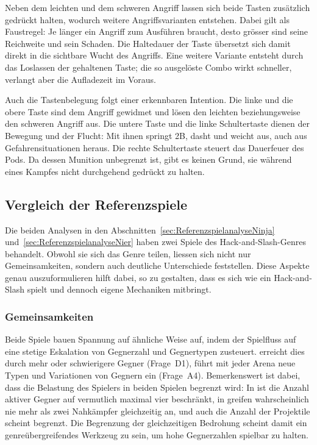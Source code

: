 \documentclass[../Main.tex]{subfiles}
\begin{document}
Neben dem leichten und dem schweren Angriff lassen sich beide Tasten zusätzlich gedrückt halten, wodurch weitere Angriffsvarianten entstehen. Dabei gilt als Faustregel: Je länger ein Angriff zum Ausführen braucht, desto grösser sind seine Reichweite und sein Schaden. Die Haltedauer der Taste übersetzt sich damit direkt in die sichtbare Wucht des Angriffs. Eine weitere Variante entsteht durch das Loslassen der gehaltenen Taste; die so ausgelöste Combo wirkt schneller, verlangt aber die Aufladezeit im Voraus.

Auch die Tastenbelegung folgt einer erkennbaren Intention. Die linke und die obere Taste sind dem Angriff gewidmet und lösen den leichten beziehungsweise den schweren Angriff aus. Die untere Taste und die linke Schultertaste dienen der Bewegung und der Flucht: Mit ihnen springt 2B, dasht und weicht aus, auch aus Gefahrensituationen heraus. Die rechte Schultertaste steuert das Dauerfeuer des Pods. Da dessen Munition unbegrenzt ist, gibt es keinen Grund, sie während eines Kampfes nicht durchgehend gedrückt zu halten.

\subsection{Vergleich der Referenzspiele} \label{sec:Vergleich}

Die beiden Analysen in den Abschnitten~\ref{sec:ReferenzspielanalyseNinja} und~\ref{sec:ReferenzspielanalyseNier} haben zwei Spiele des Hack-and-Slash-Genres behandelt. Obwohl sie sich das Genre teilen, liessen sich nicht nur Gemeinsamkeiten, sondern auch deutliche Unterschiede feststellen. Diese Aspekte genau auszuformulieren hilft dabei,  so zu gestalten, dass es sich wie ein Hack-and-Slash spielt und dennoch eigene Mechaniken mitbringt.

\subsubsection{Gemeinsamkeiten}

Beide Spiele bauen Spannung auf ähnliche Weise auf, indem der Spielfluss auf eine stetige Eskalation von Gegnerzahl und Gegnertypen zusteuert.  erreicht dies durch mehr oder schwierigere Gegner (Frage~D1),  führt mit jeder Arena neue Typen und Variationen von Gegnern ein (Frage~A4). Bemerkenswert ist dabei, dass die Belastung des Spielers in beiden Spielen begrenzt wird: In  ist die Anzahl aktiver Gegner auf vermutlich maximal vier beschränkt, in  greifen wahrscheinlich nie mehr als zwei Nahkämpfer gleichzeitig an, und auch die Anzahl der Projektile scheint begrenzt. Die Begrenzung der gleichzeitigen Bedrohung scheint damit ein genreübergreifendes Werkzeug zu sein, um hohe Gegnerzahlen spielbar zu halten.
\end{document}
